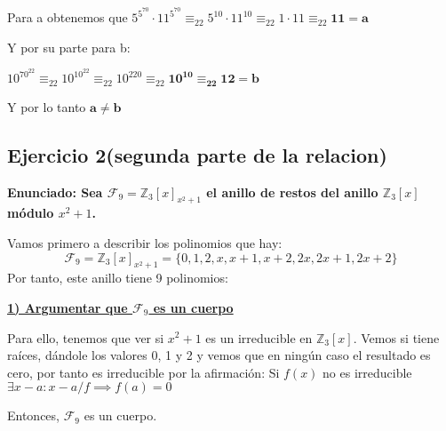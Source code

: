 \documentclass[11pt, a4paper, titlepage]{article}
\providecommand{\ent}{\mathbb{Z}}
\begin{document}
Para a obtenemos que $5^{5^{70}}\cdot11^{5^{70}}\equiv_{22}5^{10} \cdot 11^{10} \equiv_{22} 1 \cdot 11\equiv_{22}\mathbf{11 = a}$

Y por su parte para b:

$10^{70^{22}} \equiv_{22} 10^{10^{22}}\equiv_{22} 10^{220} \equiv_{22}\mathbf{10^{10}\equiv_{22}12=b}$

Y por lo tanto $\mathbf{a \neq b}$



\subsection{\LARGE{Ejercicio 2(segunda parte de la relacion)}} 

\textbf{Enunciado: Sea $\mathcal{F}_9 = \ent_3[x]_{ x^2 +1}$ el anillo de restos del anillo $\ent_3[x]$ módulo $x^2 +1$.}


Vamos primero a describir los polinomios que hay:
\[
\mathcal{F}_9 =\ent_3[x]_{x^2+1}= \{0,1,2,x,x+1,x+2,2x,2x+1,2x+2\}
\]
Por tanto, este anillo tiene 9 polinomios:

\underline{\textbf{1) Argumentar que $\mathcal{F}_9$ es un cuerpo}}

Para ello, tenemos que ver si $x^2+1$ es un irreducible en $\ent_3[x]$. Vemos si tiene raíces, dándole los valores 0, 1 y 2 y vemos que en ningún caso el resultado es cero, por tanto es irreducible por la afirmación: Si $f(x)$ no es irreducible $\exists x-a : x-a/f \implies f(a) = 0$

Entonces, $\mathcal{F}_9$ es un cuerpo.
\end{document}
